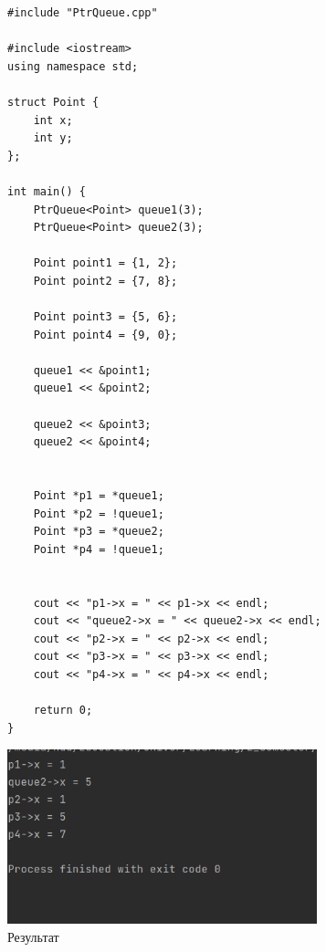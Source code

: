 \documentclass[a4paper, 14pt]{extarticle}
\begin{document}
\begin{figure}[!htb]
\begin{lstlisting}[language={},caption={Проверка работоспособности},label={lst:main}]
#include "PtrQueue.cpp"

#include <iostream>
using namespace std;

struct Point {
    int x;
    int y;
};

int main() {
    PtrQueue<Point> queue1(3);
    PtrQueue<Point> queue2(3);
    
    Point point1 = {1, 2};
    Point point2 = {7, 8};
    
    Point point3 = {5, 6};
    Point point4 = {9, 0};
    
    queue1 << &point1;
    queue1 << &point2;
    
    queue2 << &point3;
    queue2 << &point4;
    
    
    Point *p1 = *queue1;
    Point *p2 = !queue1;
    Point *p3 = *queue2;
    Point *p4 = !queue1;
    
    
    cout << "p1->x = " << p1->x << endl;
    cout << "queue2->x = " << queue2->x << endl;
    cout << "p2->x = " << p2->x << endl;
    cout << "p3->x = " << p3->x << endl;
    cout << "p4->x = " << p4->x << endl;
    
    return 0;
}
\end{lstlisting}
\end{figure}


\begin{figure}[!htb]
	\centering
	\includegraphics[width=0.8\textwidth]{output.png}
\caption{Результат}
\label{fig:output}
\end{figure}
\end{document}
